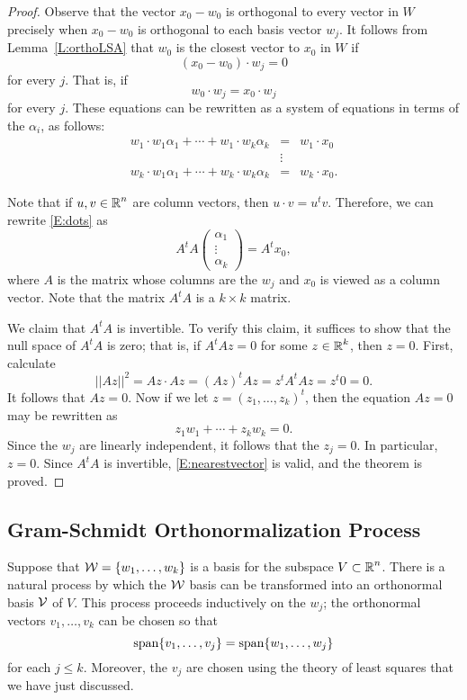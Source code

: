 \documentclass{ximera}
\begin{document}
\begin{proof} Observe that the vector $x_0-w_0$ is orthogonal to every vector in $W$
precisely when $x_0-w_0$ is orthogonal to each basis vector $w_j$.  It
follows from Lemma~\ref{L:orthoLSA} that $w_0$ is the closest vector to $x_0$
in $W$ if
\[
(x_0-w_0)\cdot w_j = 0
\]
for every $j$.  That is, if
\[
w_0\cdot w_j = x_0\cdot w_j
\]
for every $j$.  These equations can be rewritten as a system of equations in
terms of the $\alpha_i$, as follows:
\begin{equation}  \label{E:dots}
 \begin{array}{ccc}
w_1\cdot w_1\alpha_1 + \cdots + w_1\cdot w_k\alpha_k & = & w_1\cdot x_0\\
 & \vdots &  \\
w_k\cdot w_1\alpha_1 + \cdots + w_k\cdot w_k\alpha_k & = & w_k\cdot x_0.
\end{array}
\end{equation}

Note that if $u,v\in\mbox{$\Bbb{R}$}^n$ are column vectors, then $u\cdot v= u^tv$. Therefore,
we can rewrite \eqref{E:dots} as
\[
A^tA \left(\begin{array}{c} \alpha_1\\ \vdots \\ \alpha_k \end{array}\right) =
A^tx_0,
\]
where $A$ is the matrix whose columns are the $w_j$ and $x_0$ is viewed as a
column vector.  Note that the matrix $A^tA$ is a $k\times k$ matrix.

We claim that $A^tA$ is invertible.  To verify this claim, it suffices to
show that the null space
of $A^tA$ is zero; that is, if $A^tA z = 0$ for some
$z\in\mbox{$\Bbb{R}$}^k$, then $z=0$.  First, calculate
\[
||Az||^2 = Az\cdot Az = (Az)^tAz = z^tA^tAz= z^t0 = 0.
\]
It follows that $Az=0$.  Now if we let $z=(z_1,\ldots,z_k)^t$, then the
equation $Az=0$ may be rewritten as
\[
z_1w_1 + \cdots + z_kw_k = 0.
\]
Since the $w_j$ are linearly independent, it follows that the $z_j=0$.  In
particular, $z=0$.  Since $A^tA$ is invertible, \eqref{E:nearestvector} is
valid, and the theorem is proved. \end{proof}


\subsection*{Gram-Schmidt Orthonormalization Process}

Suppose that ${\cal W} = \{w_1,\ldots,w_k\}$ is a basis for the subspace
$V\subset\mbox{$\Bbb{R}$}^n$.  There is a natural process by which the ${\cal W}$ basis
can be transformed into an
orthonormal basis
${\cal V}$ of $V$.  This
process proceeds inductively on the $w_j$; the orthonormal vectors
$v_1,\ldots,v_k$ can be chosen so that
\[
{\rm span}\{v_1,\ldots,v_j\} = {\rm span}\{w_1,\ldots,w_j\}
\]
for each $j\leq k$.  Moreover, the $v_j$ are chosen using the theory of
least squares that we have just discussed.
\end{document}
